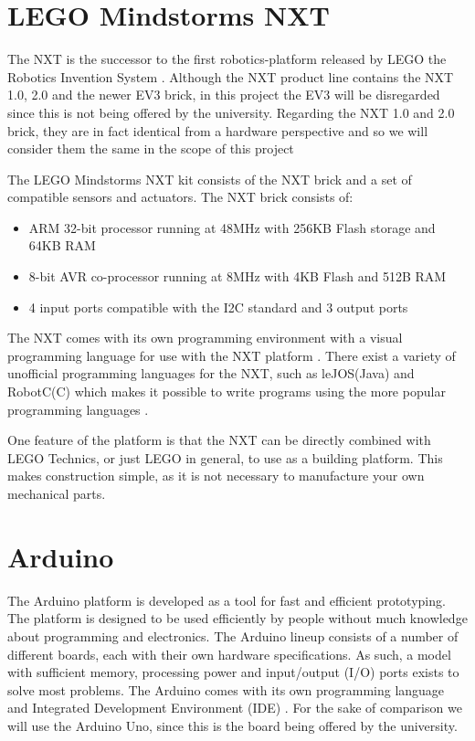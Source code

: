 \section{LEGO Mindstorms NXT}
The NXT is the successor to the first robotics-platform released
by LEGO the Robotics Invention System \citep{NXTHistory}. Although the NXT
product line contains the NXT 1.0, 2.0 and the newer EV3 brick, in this project
the EV3 will be disregarded since this is not being offered by the university.
Regarding the NXT 1.0 and 2.0 brick, they are in fact identical from a hardware
perspective and so we will consider them the same in the scope of this project
\citep{NXTversions}\nl

The LEGO Mindstorms NXT kit consists of the NXT brick and a set of
compatible sensors and actuators. The NXT brick \citep[P.3]{NXTStatsV2} consists
of:

\begin{itemize}
  \item ARM 32-bit processor running at 48MHz with 256KB Flash storage and 64KB RAM
  \item 8-bit AVR co-processor running at 8MHz with 4KB Flash and 512B RAM
  \item 4 input ports compatible with the I2C standard and 3 output ports
\end{itemize}

The NXT comes with its own programming environment with a visual
programming language for use with the NXT platform \cite{NXTG}. There exist a
variety of unofficial programming languages for the NXT, such as leJOS(Java) and
RobotC(C) which makes it possible to write programs using the more popular programming
languages \citep{NXTProgrammingLanguage}.\nl

One feature of the platform is that the NXT can be directly combined with
LEGO Technics, or just LEGO in general, to use as a building platform. This
makes construction simple, as it is not necessary to manufacture your own
mechanical parts.

\section{Arduino}
The Arduino platform is developed as a tool for fast and efficient prototyping.
The platform is designed to be used efficiently by people without
much knowledge about programming and electronics. The Arduino lineup consists of
a number of different boards, each with their own hardware specifications.
As such, a model with sufficient memory, processing power and input/output (I/O)
ports exists to solve most problems. The Arduino comes with its own programming
language and Integrated Development Environment (IDE) \citep{ArduinoIntro}. For
the sake of comparison we will use the Arduino Uno, since this is the board being offered by the university.\nl

